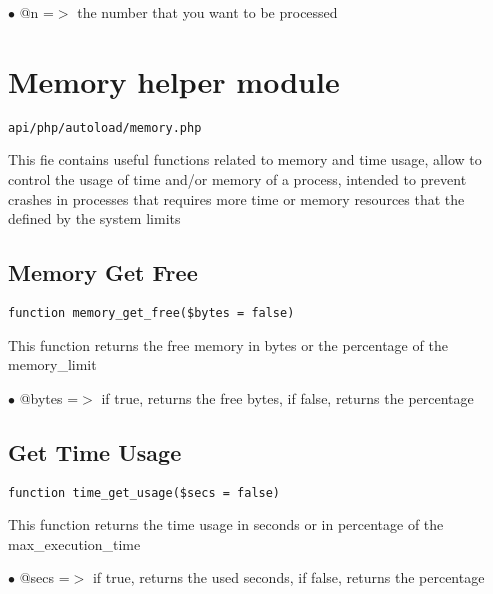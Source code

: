 \documentclass[a4paper]{book}
\begin{document}
\begin{compactitem}
\item[\color{myblue}$\bullet$] @n =$>$ the number that you want to be processed
\end{compactitem}

\hypertarget{toc202}{}
\section{Memory helper module}

\begin{lstlisting}
api/php/autoload/memory.php
\end{lstlisting}

This fie contains useful functions related to memory and time usage, allow to control the usage
of time and/or memory of a process, intended to prevent crashes in processes that requires more
time or memory resources that the defined by the system limits

\hypertarget{toc203}{}
\subsection{Memory Get Free}

\begin{lstlisting}
function memory_get_free($bytes = false)
\end{lstlisting}

This function returns the free memory in bytes or the percentage of the memory\_limit

\begin{compactitem}
\item[\color{myblue}$\bullet$] @bytes =$>$ if true, returns the free bytes, if false, returns the percentage
\end{compactitem}

\hypertarget{toc204}{}
\subsection{Get Time Usage}

\begin{lstlisting}
function time_get_usage($secs = false)
\end{lstlisting}

This function returns the time usage in seconds or in percentage of the max\_execution\_time

\begin{compactitem}
\item[\color{myblue}$\bullet$] @secs =$>$ if true, returns the used seconds, if false, returns the percentage
\end{compactitem}
\end{document}
